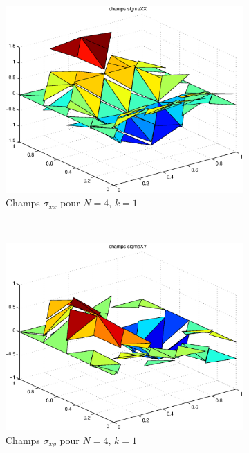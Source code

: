 \begin{figure}[h!]
  \centering
  \begin{subfigure}[b]{0.32\textwidth}
  \includegraphics[width=\textwidth]{images/sigmaxxN4.eps}
  \caption{Champs $\sigma_{xx}$ pour $N=4$, $k=1$}
  \end{subfigure}%
  ~
  \begin{subfigure}[b]{0.32\textwidth}
  \includegraphics[width=\textwidth]{images/sigmaxyN4.eps}
  \caption{Champs $\sigma_{xy}$ pour $N=4$, $k=1$}
  \end{subfigure}
  ~
  \begin{subfigure}[b]{0.32\textwidth}

\end{subfigure}
\end{figure}
